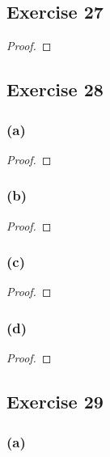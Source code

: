 \documentclass[14pt]{extarticle}
\begin{document}
\subsection{Exercise 27}

\begin{proof}

\end{proof}

\subsection{Exercise 28}

\subsubsection{(a)}

\begin{proof}

\end{proof}

\subsubsection{(b)}

\begin{proof}

\end{proof}

\subsubsection{(c)}

\begin{proof}

\end{proof}

\subsubsection{(d)}

\begin{proof}

\end{proof}

\subsection{Exercise 29}

\subsubsection{(a)}
\end{document}
